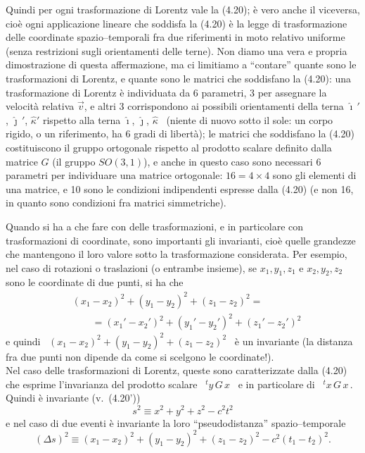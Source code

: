 Quindi per ogni trasformazione di Lorentz vale la (4.20); \`e vero anche il
viceversa, cio\`e ogni applicazione lineare che soddisfa la (4.20) \`e la legge
di trasformazione delle coordinate spazio--temporali fra due riferimenti in moto
relativo uniforme (senza restrizioni sugli orientamenti delle terne). Non diamo
una vera e propria dimostrazione di questa affermazione, ma ci limitiamo a
``contare'' quante sono le trasformazioni di Lorentz, e quante sono le matrici
che soddisfano la (4.20): una trasformazione di Lorentz \`e individuata da 6
parametri, 3 per assegnare la velocit\`a relativa $\vec v$, e altri 3
corrispondono ai possibili orientamenti della terna $\hat\imath\,'$,
$\hat\jmath\,'$, $\hat\kappa'$ rispetto alla terna $\hat\imath$, $\hat\jmath$,
$\hat\kappa$ \ (niente di nuovo sotto il sole: un corpo rigido, o un
riferimento, ha 6 gradi di libert\`a); le matrici che soddisfano la (4.20)
costituiscono il gruppo ortogonale rispetto al prodotto scalare definito dalla
matrice $G$ \big(il gruppo $SO(3,1)$\big), e anche in questo caso sono necessari
6 parametri per individuare una matrice ortogonale: $16=4\times4$ sono gli
elementi di una matrice, e 10 sono le condizioni indipendenti espresse dalla
(4.20) (e non 16, in quanto sono condizioni fra matrici simmetriche).

Quando si ha a che fare con delle trasformazioni, e in particolare con
trasformazioni di coordinate, sono importanti gli invarianti, cio\`e quelle
grandezze che mantengono il loro valore sotto la trasformazione considerata. Per
esempio, nel caso di rotazioni o traslazioni (o entrambe insieme), se
$x_1,y_1,z_1$ e $x_2,y_2,z_2$ sono le coordinate di due punti, si ha che
\begin{equation}
  \begin{split}
    &(x_1-x_2)^2+(y_1-y_2)^2+(z_1-z_2)^2=\\
    &\qquad=(x_1'-x_2')^2+(y_1'-y_2')^2+(z_1'-z_2')^2
  \end{split}
  \tag{4.25}
\end{equation}
e quindi \ $(x_1-x_2)^2+(y_1-y_2)^2+(z_1-z_2)^2$ \ \`e un invariante (la
distanza fra due punti non dipende da come si scelgono le coordinate!).\\
Nel caso delle trasformazioni di Lorentz, queste sono caratterizzate dalla
(4.20) che esprime l'invarianza del prodotto scalare \ ${}^ty\,G\,x$ \ e in
particolare di \ ${}^tx\,G\,x$\,. Quindi \`e invariante \big(v.\ (4.20')\big)
\begin{equation}
  s^2\equiv x^2+y^2+z^2-c^2t^2
  \tag{4.26}
\end{equation}
e nel caso di due eventi \`e invariante la loro ``pseudodistanza''
spazio--temporale
\begin{equation}
  (\Delta s)^2\equiv(x_1-x_2)^2+(y_1-y_2)^2+(z_1-z_2)^2-c^2(t_1-t_2)^2.
  \tag{4.27}
\end{equation}

